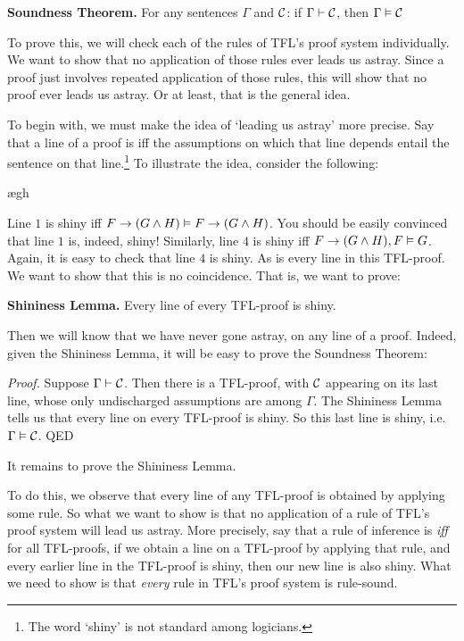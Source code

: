 \begin{factoidboxe}\textbf{Soundness Theorem.} For any sentences $\Gamma$ and $\mathcal{C}$: if $\Gamma\vdash\mathcal{C}$, then $\Gamma \vDash\mathcal{C}$
\end{factoidboxe}

To prove this, we will check each of the rules of TFL's proof system individually. We want to show that no application of those rules ever leads us astray. Since a proof just involves repeated application of those rules, this will show that no proof ever leads us astray. Or at least, that is the general idea.

To begin with, we must make the idea of `leading us astray' more precise. Say that a line of a proof is  iff the assumptions on which that line depends entail the sentence on that line.\footnote{The word `shiny' is not standard among logicians.} To illustrate the idea, consider the following:
	\begin{fitchproof}
		\open
			\ae{gh}
		\close
	\end{fitchproof}\noindent\noindent
Line $1$ is shiny iff $F \rightarrow (G \wedge H) \vDash F \rightarrow (G \wedge H)$. You should be easily convinced that line $1$ is, indeed, shiny! Similarly, line $4$ is shiny iff $F \rightarrow (G \wedge H), F \vDash G$. Again, it is easy to check that line $4$ is shiny. As is every line in this TFL-proof. We want to show that this is no coincidence. That is, we want to prove:
	\begin{factoidboxe}\textbf{Shininess Lemma.}
		Every line of every TFL-proof is shiny.
	\end{factoidboxe}\noindent
Then we will know that we have never gone astray, on any line of a proof. Indeed, given the Shininess Lemma, it will be easy to prove the Soundness Theorem:

\emph{Proof.} Suppose $\Gamma \vdash \mathcal{C}$. Then there is a TFL-proof, with $\mathcal{C}$ appearing on its last line, whose only undischarged assumptions are among $\Gamma$. The Shininess Lemma tells us that every line on every TFL-proof is shiny. So this last line is shiny, i.e.\ $\Gamma \vDash \mathcal{C}$. QED

It remains to prove the Shininess Lemma.

To do this, we observe that every line of any TFL-proof is obtained by applying some rule. So what we want to show is that no application of a rule of TFL's proof system will lead us astray. More precisely, say that a rule of inference is  \emph{iff} for all TFL-proofs, if we obtain a line on a TFL-proof by applying that rule, and every earlier line in the TFL-proof is shiny, then our new line is also shiny. What we need to show is that \emph{every} rule in TFL's proof system is rule-sound.

